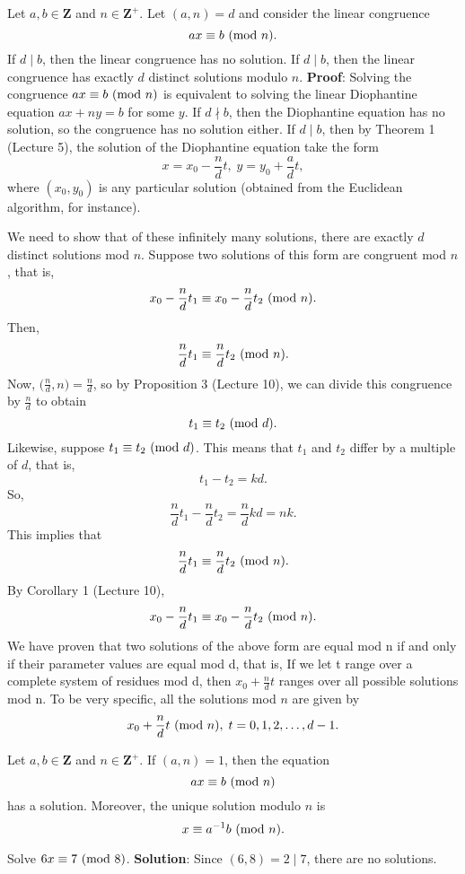 \begin{Theorem}{}{}
    Let $ a,b\in\mathbf{Z} $ and $ n\in\mathbf{Z}^+ $. Let $ (a,n)=d $ and consider the linear congruence
    \[ ax\equiv b\ (\mathrm{mod}\ n). \]
    If $ d\mid b $, then the linear congruence has no solution. If $ d\mid b $, then the linear
    congruence has exactly $ d $ distinct solutions modulo $ n $.
    \tcblower{}
    \textbf{Proof}: Solving the congruence $ ax\equiv b\ (\mathrm{mod}\ n) $ is equivalent to solving the
    linear Diophantine equation $ ax+ny=b $ for some $ y $. If $ d\nmid b $, then the Diophantine
    equation has no solution, so the congruence has no solution either.
    If $ d\mid b $, then by Theorem 1 (Lecture 5), the solution of the Diophantine equation take the form
    \[ x=x_0-\frac{n}{d}t,\; y=y_0+\frac{a}{d}t, \]
    where $ (x_0,y_0) $ is any particular solution (obtained from the Euclidean algorithm,
    for instance).

    We need to show that of these infinitely many solutions, there are exactly $d$
    distinct solutions mod $n$. Suppose two solutions of this form are congruent mod $ n $, that is,
    \[ x_0-\frac{n}{d}t_1\equiv x_0-\frac{n}{d}t_2\ (\mathrm{mod}\ n). \]
    Then,
    \[ \frac{n}{d}t_1\equiv \frac{n}{d}t_2\ (\mathrm{mod}\ n). \]
    Now, $ \bigl(\frac{n}{d},n\bigr)=\frac{n}{d} $, so by Proposition 3 (Lecture 10), we can divide this congruence by $ \frac{n}{d} $ to obtain
    \[ t_1\equiv t_2\ (\mathrm{mod}\ d). \]
    Likewise, suppose $ t_1\equiv t_2\ (\mathrm{mod}\ d) $. This means that $ t_1 $ and $ t_2 $ differ by a multiple of $ d $, that is,
    \[ t_1-t_2=kd. \]
    So,
    \[ \frac{n}{d}t_1-\frac{n}{d}t_2=\frac{n}{d}kd=nk. \]
    This implies that
    \[ \frac{n}{d}t_1\equiv \frac{n}{d}t_2\ (\mathrm{mod}\ n). \]
    By Corollary 1 (Lecture 10),
    \[ x_0-\frac{n}{d}t_1\equiv x_0-\frac{n}{d}t_2\ (\mathrm{mod}\ n). \]
    We have proven that two solutions of the above form are equal mod n if and only
    if their parameter values are equal mod d, that is, If we let t range over a complete
    system of residues mod d, then $x_0+\frac{n}{d}t$ ranges over all possible solutions mod n.
    To be very specific, all the solutions mod $n$ are given by
    \[ x_0+\frac{n}{d}t\ (\mathrm{mod}\ n),\; t=0,1,2,\ldots,d-1. \]
\end{Theorem}
\begin{Corollary}{}{}
    Let $ a,b\in\mathbf{Z} $ and $ n\in\mathbf{Z}^+ $. If $ (a,n)=1 $, then the equation
    \[ ax\equiv b\ (\mathrm{mod}\ n) \]
    has a solution. Moreover, the unique solution modulo $ n $ is
    \[ x\equiv a^{-1}b\ (\mathrm{mod}\ n). \]
\end{Corollary}
\begin{Example}{}{}
    Solve $ 6x\equiv 7\ (\mathrm{mod}\ 8) $.
    \tcblower{}
    \textbf{Solution}: Since $ (6,8)=2\mid 7 $, there are no solutions.
\end{Example}
